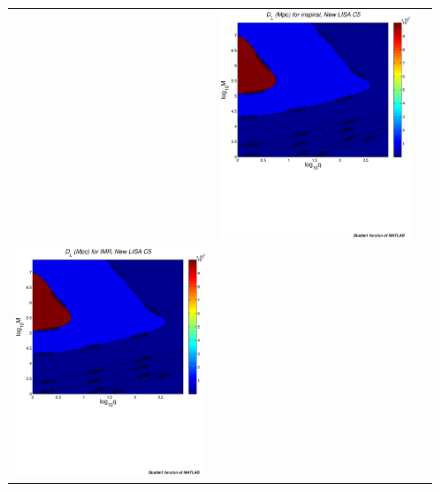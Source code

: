 \documentclass{iopart}
\begin{document}
\begin{figure}[htb]
\begin{center}
\begin{tabular}{ccc}
&\includegraphics[scale=0.33,clip=true]{FigEmanuele/C5InspDLContour.ps}\\
\includegraphics[scale=0.33,clip=true]{FigEmanuele/C5IMRDLContour.ps}

\end{tabular}
\end{center}
\end{figure}
\end{document}
